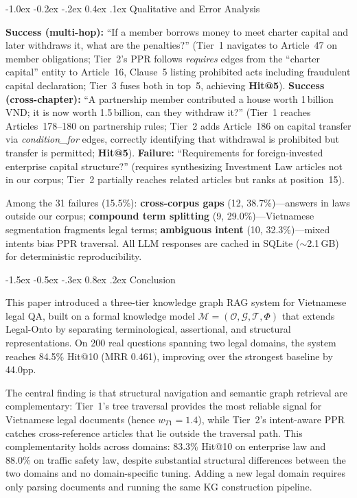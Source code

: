 \documentclass{IOS-Book-Article}
\makeatletter
\renewcommand\section{\@startsection{section}{1}{\z@}%
  {-1.5ex \@plus -0.5ex \@minus -.3ex}%
  {0.8ex \@plus .2ex}%
  {\normalfont\large\bfseries}}
\renewcommand\subsubsection{\@startsection{subsubsection}{3}{\z@}%
  {-1.0ex \@plus -0.2ex \@minus -.2ex}%
  {0.4ex \@plus .1ex}%
  {\normalfont\normalsize\itshape}}
\makeatother
\begin{document}
\subsubsection{Qualitative and Error Analysis}

\textbf{Success (multi-hop):} ``If a member borrows money to meet charter capital and later withdraws it, what are the penalties?'' (Tier~1 navigates to Article~47 on member obligations; Tier~2's PPR follows \textit{requires} edges from the ``charter capital'' entity to Article~16, Clause~5 listing prohibited acts including fraudulent capital declaration; Tier~3 fuses both in top~5, achieving \textbf{Hit@5}).
\textbf{Success (cross-chapter):} ``A partnership member contributed a house worth 1\,billion VND; it is now worth 1.5\,billion, can they withdraw it?'' (Tier~1 reaches Articles~178--180 on partnership rules; Tier~2 adds Article~186 on capital transfer via \textit{condition\_for} edges, correctly identifying that withdrawal is prohibited but transfer is permitted; \textbf{Hit@5}).
\textbf{Failure:} ``Requirements for foreign-invested enterprise capital structure?'' (requires synthesizing Investment Law articles not in our corpus; Tier~2 partially reaches related articles but ranks at position~15).

Among the 31 failures (15.5\%): \textbf{cross-corpus gaps} (12, 38.7\%)---answers in laws outside our corpus; \textbf{compound term splitting} (9, 29.0\%)---Vietnamese segmentation fragments legal terms; \textbf{ambiguous intent} (10, 32.3\%)---mixed intents bias PPR traversal. All LLM responses are cached in SQLite ($\sim$2.1\,GB) for deterministic reproducibility.

\section{Conclusion}
\label{sec:conclusion}

This paper introduced a three-tier knowledge graph RAG system for Vietnamese legal QA, built on a formal knowledge model $\mathcal{M} = (\mathcal{O}, \mathcal{G}, \mathcal{T}, \Phi)$ that extends Legal-Onto by separating terminological, assertional, and structural representations. On 200 real questions spanning two legal domains, the system reaches 84.5\% Hit@10 (MRR 0.461), improving over the strongest baseline by 44.0pp.

The central finding is that structural navigation and semantic graph retrieval are complementary: Tier~1's tree traversal provides the most reliable signal for Vietnamese legal documents (hence $w_{T1}\!=\!1.4$), while Tier~2's intent-aware PPR catches cross-reference articles that lie outside the traversal path. This complementarity holds across domains: 83.3\% Hit@10 on enterprise law and 88.0\% on traffic safety law, despite substantial structural differences between the two domains and no domain-specific tuning. Adding a new legal domain requires only parsing documents and running the same KG construction pipeline.
\end{document}

